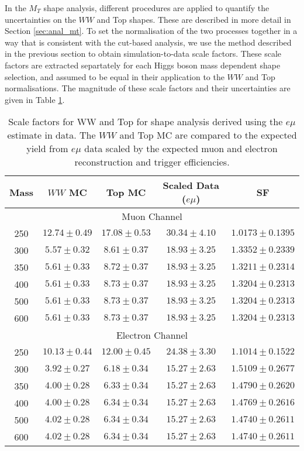 In the $M_T$ shape analysis, different procedures are applied to quantify
the uncertainties on the $WW$ and Top shapes. 
These are described in more detail in Section \ref{sec:anal_mt}.
To set the normalisation of the two processes together in a way
that is consistent with the cut-based analysis, we use the method 
described in the previous section to obtain simulation-to-data scale 
factors. These scale factors are extracted separtately for each
Higgs boson mass dependent shape selection, and assumed to be equal
in their application to the $WW$ and Top normalisations.
The magnitude of these scale factors and their uncertainties 
are given in Table \ref{tab:shape_sf_emu}.

\begin{table}[!ht]
\begin{center}
\small{
\begin{tabular}{c|c|c|c|c} 
\hline
Mass &   $WW$ MC           & Top MC            & Scaled Data ($e\mu$)   & SF \\
\hline \hline
\multicolumn{5}{c}{Muon Channel} \\ 
\hline \hline
250 & $12.74 \pm 0.49$ & $17.08 \pm 0.53$ & $30.34 \pm 4.10$  & $1.0173 \pm 0.1395$ \\ \hline 
300 & $5.57 \pm 0.32$ & $8.61 \pm 0.37$ & $18.93 \pm 3.25$  & $1.3352 \pm 0.2339$ \\ \hline 
350 & $5.61 \pm 0.33$ & $8.72 \pm 0.37$ & $18.93 \pm 3.25$  & $1.3211 \pm 0.2314$ \\ \hline 
400 & $5.61 \pm 0.33$ & $8.73 \pm 0.37$ & $18.93 \pm 3.25$  & $1.3204 \pm 0.2313$ \\ \hline 
500 & $5.61 \pm 0.33$ & $8.73 \pm 0.37$ & $18.93 \pm 3.25$  & $1.3204 \pm 0.2313$ \\ \hline 
600 & $5.61 \pm 0.33$ & $8.73 \pm 0.37$ & $18.93 \pm 3.25$  & $1.3204 \pm 0.2313$ \\ 
\hline \hline
\multicolumn{5}{c}{Electron Channel} \\ 
\hline \hline
250 & $10.13 \pm 0.44$ & $12.00 \pm 0.45$ & $24.38 \pm 3.30$  & $1.1014 \pm 0.1522$ \\ \hline
300 & $3.92 \pm 0.27$ & $6.18 \pm 0.34$ & $15.27 \pm 2.63$  & $1.5109 \pm 0.2677$ \\ \hline
350 & $4.00 \pm 0.28$ & $6.33 \pm 0.34$ & $15.27 \pm 2.63$  & $1.4790 \pm 0.2620$ \\ \hline
400 & $4.00 \pm 0.28$ & $6.34 \pm 0.34$ & $15.27 \pm 2.63$  & $1.4769 \pm 0.2616$ \\ \hline
500 & $4.02 \pm 0.28$ & $6.34 \pm 0.34$ & $15.27 \pm 2.63$  & $1.4740 \pm 0.2611$ \\ \hline
600 & $4.02 \pm 0.28$ & $6.34 \pm 0.34$ & $15.27 \pm 2.63$  & $1.4740 \pm 0.2611$ \\ \hline 
\end{tabular}
\caption{Scale factors for WW and Top for shape analysis derived using the $e\mu$ estimate in data.
The $WW$ and Top MC are compared to the expected yield from $e\mu$ data scaled by the expected muon
and electron reconstruction and trigger efficiencies.}
\label{tab:shape_sf_emu}}
\end{center}
\end{table}




